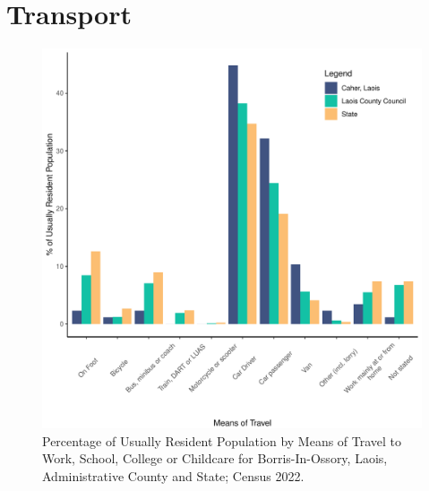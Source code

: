 \documentclass{article}
\begin{document}
\section{Transport}\label{sect:Trans}
\begin{figure}[H]
	\centering
	\includegraphics[width = 120mm]{../figures/TravelED.pdf}
	\caption{Percentage of Usually Resident Population by Means of Travel to Work, School, College or Childcare for Borris-In-Ossory, Laois, Administrative County and State; Census 2022.}
	\label{fig:vbnv}
	\end{figure}
\end{document}

